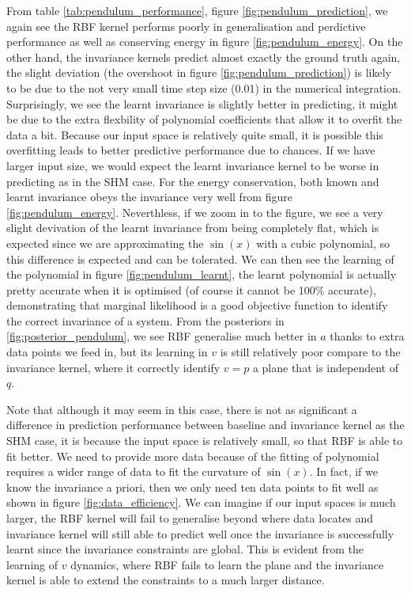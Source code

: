 \documentclass{statsmsc}
\begin{document}
From table \ref{tab:pendulum_performance}, figure \ref{fig:pendulum_prediction}, we again see the RBF kernel performs poorly in generalisation and perdictive performance as well as conserving energy in figure \ref{fig:pendulum_energy}.
On the other hand, the invariance kernels predict almost exactly the ground truth again, the slight deviation (the overshoot in figure \ref{fig:pendulum_prediction}) is likely to be due to the not very small time step size (0.01) in the numerical integration. 
Surprisingly, we see the learnt invariance is slightly better in predicting, it might be due to the extra flexbility of polynomial coefficients that allow it to overfit the data a bit. 
Because our input space is relatively quite small, it is possible this overfitting leads to better predictive performance due to chances.
If we have larger input size, we would expect the learnt invariance kernel to be worse in predicting as in the SHM case.
For the energy conservation, both known and learnt invariance obeys the invariance very well from figure \ref{fig:pendulum_energy}.
Neverthless, if we zoom in to the figure, we see a very slight devivation of the learnt invariance from being completely flat, which is expected since we are approximating the $\sin(x)$ with a cubic polynomial, so this difference is expected and can be tolerated.
We can then see the learning of the polynomial in figure \ref{fig:pendulum_learnt}, the learnt polynomial is actually pretty accurate when it is optimised (of course it cannot be 100\% accurate), demonstrating that marginal likelihood is a good objective function to identify the correct invariance of a system.
From the posteriors in \ref{fig:posterior_pendulum}, we see RBF generalise much better in $a$ thanks to extra data points we feed in, but its learning in $v$ is still relatively poor compare to the invariance kernel, where it correctly identify $v=p$ a plane that is independent of $q$.

Note that although it may seem in this case, there is not as significant a difference in prediction performance between baseline and invariance kernel as the SHM case, it is because the input space is relatively small, so that RBF is able to fit better.
We need to provide more data because of the fitting of polynomial requires a wider range of data to fit the curvature of $\sin(x)$. 
In fact, if we know the invariance a priori, then we only need ten data points to fit well as shown in figure \ref{fig:data_efficiency}.
We can imagine if our input spaces is much larger, the RBF kernel will fail to generalise beyond where data locates and invariance kernel will still able to predict well once the invariance is successfully learnt since the invariance constraints are global.
This is evident from the learning of $v$ dynamics, where RBF fails to learn the plane and the invariance kernel is able to extend the constraints to a much larger distance.
\end{document}
